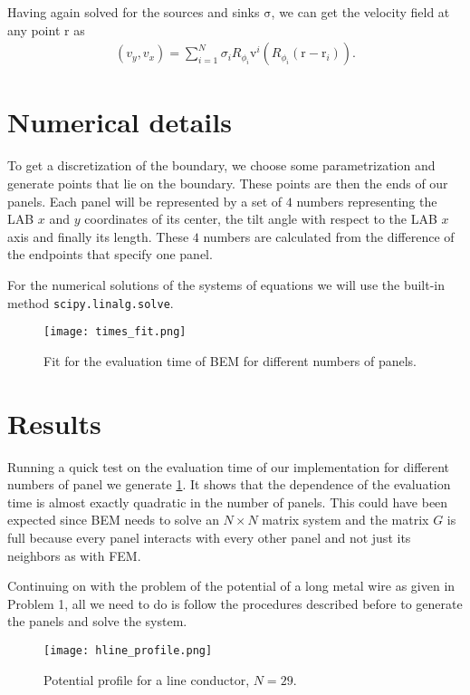 \documentclass[10pt,a4paper,twocolumn]{article}
\renewcommand{\vec}[1]{\bm{\mathrm{#1}}}
\begin{document}
Having again solved for the sources and sinks $\vec{\sigma}$, we can get the velocity field at any point $\vec{r}$ as
%
\begin{align}
    (v_y, v_x) = \sum_{i=1}^{N} \sigma_i R_{\phi_i}\vec{v}^i(R_{\phi_i}(\vec{r} - \vec{r}_i)).
\end{align}

\section{Numerical details}

To get a discretization of the boundary, we choose some parametrization and generate points that lie on the boundary. These points are then the ends of our panels. Each panel will be represented by a set of $4$ numbers representing the LAB $x$ and $y$ coordinates of its center, the tilt angle with respect to the LAB $x$ axis and finally its length. These $4$ numbers are calculated from the difference of the endpoints that specify one panel.

For the numerical solutions of the systems of equations we will use the built-in method \texttt{scipy.linalg.solve}.

\begin{figure}[!h]
    \centering
    \texttt{[image: times\_fit.png]}
    \caption{Fit for the evaluation time of BEM for different numbers of panels.}
    \label{fig:times_fit}
\end{figure}

\section{Results}

Running a quick test on the evaluation time of our implementation for different numbers of panel we generate \cref{fig:times_fit}. It shows that the dependence of the evaluation time is almost exactly quadratic in the number of panels. This could have been expected since BEM needs to solve an $N \times N$ matrix system and the matrix $G$ is full because every panel interacts with every other panel and not just its neighbors as with FEM.


Continuing on with the problem of the potential of a long metal wire as given in Problem 1, all we need to do is follow the procedures described before to generate the panels and solve the system.

\begin{figure}[!h]
    \centering
    \texttt{[image: hline\_profile.png]}
    \caption{Potential profile for a line conductor, $N=29$.}
    \label{fig:line_profile}
\end{figure}
\end{document}
